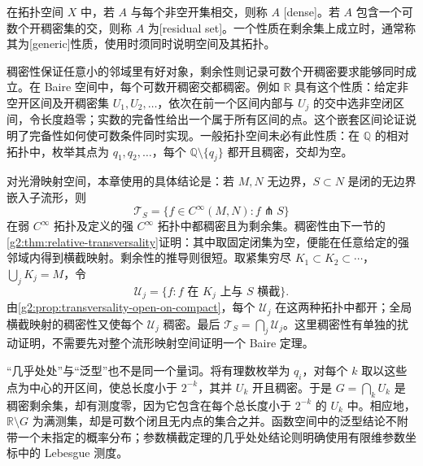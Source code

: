 \begin{definition}\label{g2:def:generic-residual}
	在拓扑空间 \(X\) 中，若 \(A\) 与每个非空开集相交，则称 \(A\) [dense]。若 \(A\) 包含一个可数个开稠密集的交，则称 \(A\) 为[residual set]。一个性质在剩余集上成立时，通常称其为[generic]性质，使用时须同时说明空间及其拓扑。
\end{definition}

稠密性保证任意小的邻域里有好对象，剩余性则记录可数个开稠密要求能够同时成立。在 Baire 空间中，每个可数开稠密交都稠密。例如 \(\mathbb R\) 具有这个性质：给定非空开区间及开稠密集 \(U_1,U_2,\ldots\)，依次在前一个区间内部与 \(U_j\) 的交中选非空闭区间，令长度趋零；实数的完备性给出一个属于所有区间的点。这个嵌套区间论证说明了完备性如何使可数条件同时实现。一般拓扑空间未必有此性质：在 \(\mathbb Q\) 的相对拓扑中，枚举其点为 \(q_1,q_2,\ldots\)，每个 \(\mathbb Q\setminus\{q_j\}\) 都开且稠密，交却为空。

\ProseParagraphBreak

对光滑映射空间，本章使用的具体结论是：若 \(M,N\) 无边界，\(S\subset N\) 是闭的无边界嵌入子流形，则
\[
	\mathcal T_S=\{f\in C^\infty(M,N):f\pitchfork S\}
\]
在弱 \(C^\infty\) 拓扑及定义的强 \(C^\infty\) 拓扑中都稠密且为剩余集。稠密性由下一节的\cref{g2:thm:relative-transversality}证明：其中取固定闭集为空，便能在任意给定的强邻域内得到横截映射。剩余性的推导则很短。取紧集穷尽 \(K_1\subset K_2\subset\cdots\)，\(\bigcup_jK_j=M\)，令
\[
	\mathcal U_j=\{f:f\text{ 在 }K_j\text{ 上与 }S\text{ 横截}\}.
\]
由\cref{g2:prop:transversality-open-on-compact}，每个 \(\mathcal U_j\) 在这两种拓扑中都开；全局横截映射的稠密性又使每个 \(\mathcal U_j\) 稠密。最后 \(\mathcal T_S=\bigcap_j\mathcal U_j\)。这里稠密性有单独的扰动证明，不需要先对整个流形映射空间证明一个 Baire 定理。

\ProseParagraphBreak

“几乎处处”与“泛型”也不是同一个量词。将有理数枚举为 \(q_i\)，对每个 \(k\) 取以这些点为中心的开区间，使总长度小于 \(2^{-k}\)，其并 \(U_k\) 开且稠密。于是 \(G=\bigcap_kU_k\) 是稠密剩余集，却有测度零，因为它包含在每个总长度小于 \(2^{-k}\) 的 \(U_k\) 中。相应地，\(\mathbb R\setminus G\) 为满测集，却是可数个闭且无内点的集合之并。函数空间中的泛型结论不附带一个未指定的概率分布；参数横截定理的几乎处处结论则明确使用有限维参数坐标中的 Lebesgue 测度。
